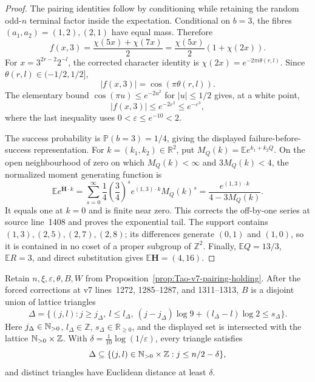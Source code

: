 \begin{proof}
The pairing identities follow by conditioning while retaining the random
odd-\(n\) terminal factor inside the expectation.  Conditional on \(b=3\),
the fibres \((a_1,a_2)=(1,2),(2,1)\) have equal mass.  Therefore
\[
 f(x,3)=\frac{\chi(5x)+\chi(7x)}2
 =\frac{\chi(5x)}2(1+\chi(2x)).
\]
For \(x=3^{2r-2}2^{-l}\), the corrected character identity is
\(\chi(2x)=e^{-2\pi i\theta(r,l)}\).  Since
\(\theta(r,l)\in(-1/2,1/2]\),
\[
 |f(x,3)|=\cos(\pi\theta(r,l)).
\]
The elementary bound
\(\cos(\pi u)\le e^{-2u^2}\) for \(|u|\le1/2\) gives, at a white point,
\[
 |f(x,3)|\le e^{-2\varepsilon^2}\le e^{-\varepsilon^3},
\]
where the last inequality uses \(0<\varepsilon\le e^{-10}<2\).

The success probability is \(\mathbb P(b=3)=1/4\), giving the displayed
failure-before-success representation.  For
\(k=(k_1,k_2)\in\mathbb R^2\), put
\(M_Q(k)=\mathbb E e^{k_1+k_2Q}\).  On the open neighbourhood of zero on
which \(M_Q(k)<\infty\) and \(3M_Q(k)<4\), the normalized moment generating
function is
\begin{equation}
\label{eq:Tao-hold-mgf-corrected}
 \mathbb E e^{\mathbf H\cdot k}
 =\sum_{s=0}^\infty\frac14\left(\frac34\right)^s
 e^{(1,3)\cdot k}M_Q(k)^s
 =\frac{e^{(1,3)\cdot k}}{4-3M_Q(k)}.
\end{equation}
It equals one at \(k=0\) and is finite near zero.  This corrects the
off-by-one series at source line~1408 and proves the exponential tail.
The support contains \((1,3),(2,5),(2,7),(2,8)\); its differences generate
\((0,1)\) and \((1,0)\), so it is contained in no coset of a proper subgroup
of \(\mathbb Z^2\).  Finally,
\(\mathbb E Q=13/3\), \(\mathbb ER=3\), and direct substitution gives
\(\mathbb E\mathbf H=(4,16)\).
\end{proof}

\begin{proposition}
\label{prop:Tao-v7-black-triangles}
Retain \(n,\xi,\varepsilon,\theta,B,W\) from
Proposition~\ref{prop:Tao-v7-pairing-holding}.
After the forced corrections at v7 lines~1272, 1285--1287, and
1311--1313, \(B\) is a disjoint union of lattice triangles
\[
 \Delta=\{(j,l):j\ge j_\Delta,\ l\le l_\Delta,\
 (j-j_\Delta)\log9+(l_\Delta-l)\log2\le s_\Delta\}.
\]
Here \(j_\Delta\in\mathbb{N}_{>0}\), \(l_\Delta\in\mathbb Z\),
\(s_\Delta\in\mathbb R_{\ge0}\), and the displayed set is intersected with
the lattice \(\mathbb{N}_{>0}\times\mathbb Z\).
With \(\delta=\frac1{10}\log(1/\varepsilon)\), every triangle satisfies
\[
 \Delta\subseteq
 \{(j,l)\in\mathbb{N}_{>0}\times\mathbb Z:j\le n/2-\delta\},
\]
and
distinct triangles have Euclidean distance at least \(\delta\).
\end{proposition}

